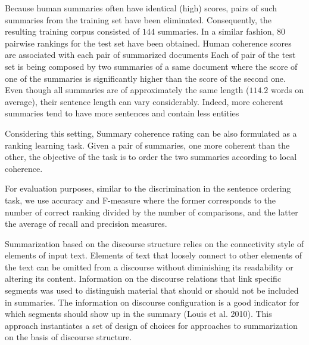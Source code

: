 Because human summaries often have identical (high) scores, pairs of such summaries from the training set have been eliminated. 
Consequently, the resulting training corpus consisted of $144$ summaries. 
In a similar fashion, $80$ pairwise rankings for the test set have been obtained. 
Human coherence scores are associated with each pair of summarized documents \cite{barzilay08} Each of pair of the test set is being composed by two summaries of a same document where the score of one of the summaries is significantly higher than the score of the second one. 
Even though all summaries are of approximately the same length ($114.2$ words on average), their sentence length can vary considerably. 
Indeed, more coherent summaries tend to have more sentences and contain less entities

Considering this setting, Summary coherence rating can be also formulated as a ranking learning task.
Given a pair of summaries, one more coherent than the other, the objective of the task is to order the two summaries according to local coherence.

For evaluation purposes, similar to the discrimination  in the sentence ordering task, we use  accuracy and F-measure where the former corresponds to the number of correct ranking divided by the number of comparisons, and the latter the average of recall and precision measures.

Summarization based on the discourse structure relies on the connectivity style of elements of input text. 
Elements of text that loosely connect to other elements of the text can be omitted from a discourse without diminishing its readability or altering its content. 
Information on the discourse relations that link specific segments was used to distinguish material that should or should not be included in summaries. 
The information on discourse configuration is a good indicator for which segments should show up in the summary (Louis et al. 2010). 
This approach instantiates a set of design of choices for approaches to summarization on the basis of discourse structure.

